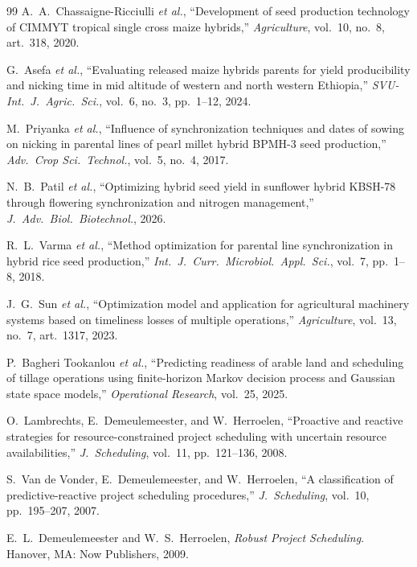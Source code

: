 \documentclass[10pt,twocolumn]{article}
\begin{document}
\begin{thebibliography}{99}
A.~A.~Chassaigne-Ricciulli \textit{et al.},
``Development of seed production technology of CIMMYT tropical single cross
maize hybrids,'' \textit{Agriculture}, vol.~10, no.~8, art.~318, 2020.

G.~Asefa \textit{et al.},
``Evaluating released maize hybrids parents for yield producibility and
nicking time in mid altitude of western and north western Ethiopia,''
\textit{SVU-Int.\ J.\ Agric.\ Sci.}, vol.~6, no.~3, pp.~1--12, 2024.

M.~Priyanka \textit{et al.},
``Influence of synchronization techniques and dates of sowing on nicking in
parental lines of pearl millet hybrid BPMH-3 seed production,''
\textit{Adv.\ Crop Sci.\ Technol.}, vol.~5, no.~4, 2017.

N.~B.~Patil \textit{et al.},
``Optimizing hybrid seed yield in sunflower hybrid KBSH-78 through flowering
synchronization and nitrogen management,'' \textit{J.\ Adv.\ Biol.\
Biotechnol.}, 2026.

R.~L.~Varma \textit{et al.},
``Method optimization for parental line synchronization in hybrid rice seed
production,'' \textit{Int.\ J.\ Curr.\ Microbiol.\ Appl.\ Sci.}, vol.~7,
pp.~1--8, 2018.

J.~G.~Sun \textit{et al.},
``Optimization model and application for agricultural machinery systems based
on timeliness losses of multiple operations,'' \textit{Agriculture},
vol.~13, no.~7, art.~1317, 2023.

P.~Bagheri Tookanlou \textit{et al.},
``Predicting readiness of arable land and scheduling of tillage operations
using finite-horizon Markov decision process and Gaussian state space
models,'' \textit{Operational Research}, vol.~25, 2025.

O.~Lambrechts, E.~Demeulemeester, and W.~Herroelen,
``Proactive and reactive strategies for resource-constrained project
scheduling with uncertain resource availabilities,'' \textit{J.\ Scheduling},
vol.~11, pp.~121--136, 2008.

S.~Van de Vonder, E.~Demeulemeester, and W.~Herroelen,
``A classification of predictive-reactive project scheduling procedures,''
\textit{J.\ Scheduling}, vol.~10, pp.~195--207, 2007.

E.~L.~Demeulemeester and W.~S.~Herroelen,
\textit{Robust Project Scheduling}. Hanover, MA: Now Publishers, 2009.


\end{thebibliography}
\end{document}
